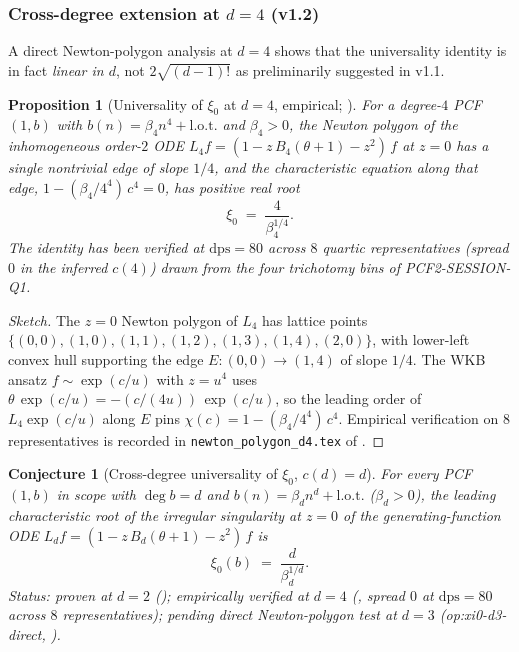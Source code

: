 \documentclass[11pt,reqno]{amsart}
\theoremstyle{plain}
\newtheorem{proposition}[theorem]{Proposition}
\newtheorem{conjecture}[theorem]{Conjecture}
\theoremstyle{definition}
\theoremstyle{remark}
\begin{document}
\subsubsection*{Cross-degree extension at $d=4$ (v1.2)}

A direct Newton-polygon analysis at $d=4$
\cite{siarc_pcf2_session_q1} shows that the universality
identity is in fact \emph{linear in $d$}, not
$2\sqrt{(d-1)!}$ as preliminarily suggested in v1.1.

\begin{proposition}[Universality of $\xi_0$ at $d=4$, empirical;
\cite{siarc_pcf2_session_q1}]
\label{prop:xi0-d4}
For a degree-$4$ PCF $(1, b)$ with
$b(n) = \beta_4 n^4 + \mathrm{l.o.t.}$ and $\beta_4 > 0$, the
Newton polygon of the inhomogeneous order-$2$ ODE
$L_4 f = (1 - z\,B_4(\theta+1) - z^2)\,f$ at $z=0$ has a
single nontrivial edge of slope $1/4$, and the
characteristic equation along that edge,
$1 - (\beta_4/4^4)\,c^4 = 0$, has positive real root
\[
  \xi_0 \;=\; \frac{4}{\beta_4^{1/4}}.
\]
The identity has been verified at $\mathrm{dps}=80$ across
$8$ quartic representatives (spread $0$ in the inferred
$c(4)$) drawn from the four trichotomy bins of
PCF2-SESSION-Q1.
\end{proposition}

\begin{proof}[Sketch]
The $z=0$ Newton polygon of $L_4$ has lattice points
$\{(0,0),(1,0),(1,1),(1,2),(1,3),(1,4),(2,0)\}$, with
lower-left convex hull supporting the edge $E:(0,0)\to(1,4)$
of slope $1/4$. The WKB ansatz $f \sim \exp(c/u)$ with
$z = u^4$ uses
$\theta\,\exp(c/u) = -(c/(4u))\,\exp(c/u)$, so the leading
order of $L_4 \exp(c/u)$ along $E$ pins
$\chi(c) = 1 - (\beta_4/4^4)\,c^4$. Empirical verification
on $8$ representatives is recorded in
\texttt{newton\_polygon\_d4.tex} of
\cite{siarc_pcf2_session_q1}.
\end{proof}

\begin{conjecture}[Cross-degree universality of $\xi_0$,
$c(d) = d$]
\label{conj:xi0-univ}
For every PCF $(1, b)$ in scope with $\deg b = d$ and
$b(n) = \beta_d n^d + \mathrm{l.o.t.}$ ($\beta_d > 0$), the
leading characteristic root of the irregular singularity at
$z = 0$ of the generating-function ODE
$L_d f = (1 - z\,B_d(\theta+1) - z^2)\,f$ is
\[
  \xi_0(b) \;=\; \frac{d}{\beta_d^{1/d}}.
\]
Status: \emph{proven} at $d=2$ (); empirically
\emph{verified} at $d=4$ (, spread $0$ at
$\mathrm{dps}=80$ across $8$ representatives); pending direct
Newton-polygon test at $d=3$ (\textsf{op:xi0-d3-direct},
).
\end{conjecture}
\end{document}
